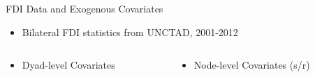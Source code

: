 \documentclass{beamer}
\begin{document}
\begin{frame}{FDI Data and Exogenous Covariates}

\begin{itemize}
\item{Bilateral FDI statistics from UNCTAD, 2001-2012}
\end{itemize}

\begin{columns}[T]
    \begin{column}{.5\textwidth}
\begin{itemize}
\item{Dyad-level Covariates}
\end{itemize}
    \end{column}
    \begin{column}{.5\textwidth}
\begin{itemize}
\item{Node-level Covariates (s/r)}
\end{itemize}
        \end{column}
  \end{columns}
 
 
  

\end{frame}
\end{document}
